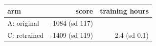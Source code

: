 \begin{tabular}{lrr}
\toprule
arm & score & training hours \\
\midrule
A: original & -1084 (sd 117) &  \\
C: retrained & -1409 (sd 119) & 2.4 (sd 0.1) \\
\bottomrule
\end{tabular}

